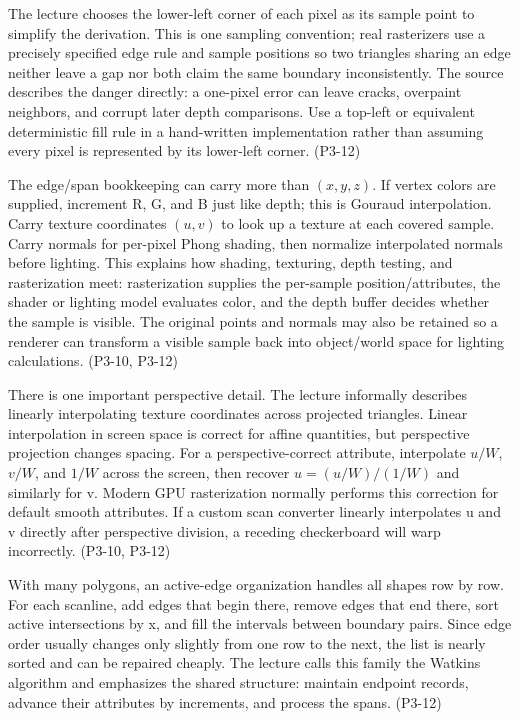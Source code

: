 The lecture chooses the lower-left corner of each pixel as its sample point to simplify the derivation. This is one sampling convention; real rasterizers use a precisely specified edge rule and sample positions so two triangles sharing an edge neither leave a gap nor both claim the same boundary inconsistently. The source describes the danger directly: a one-pixel error can leave cracks, overpaint neighbors, and corrupt later depth comparisons. Use a top-left or equivalent deterministic fill rule in a hand-written implementation rather than assuming every pixel is represented by its lower-left corner. (P3-12)

The edge/span bookkeeping can carry more than \((x,y,z)\). If vertex colors are supplied, increment R, G, and B just like depth; this is Gouraud interpolation. Carry texture coordinates \((u,v)\) to look up a texture at each covered sample. Carry normals for per-pixel Phong shading, then normalize interpolated normals before lighting. This explains how shading, texturing, depth testing, and rasterization meet: rasterization supplies the per-sample position/attributes, the shader or lighting model evaluates color, and the depth buffer decides whether the sample is visible. The original points and normals may also be retained so a renderer can transform a visible sample back into object/world space for lighting calculations. (P3-10, P3-12)

There is one important perspective detail. The lecture informally describes linearly interpolating texture coordinates across projected triangles. Linear interpolation in screen space is correct for affine quantities, but perspective projection changes spacing. For a perspective-correct attribute, interpolate \(u/W\), \(v/W\), and \(1/W\) across the screen, then recover \(u=(u/W)/(1/W)\) and similarly for v. Modern GPU rasterization normally performs this correction for default smooth attributes. If a custom scan converter linearly interpolates u and v directly after perspective division, a receding checkerboard will warp incorrectly. (P3-10, P3-12)

With many polygons, an active-edge organization handles all shapes row by row. For each scanline, add edges that begin there, remove edges that end there, sort active intersections by x, and fill the intervals between boundary pairs. Since edge order usually changes only slightly from one row to the next, the list is nearly sorted and can be repaired cheaply. The lecture calls this family the Watkins algorithm and emphasizes the shared structure: maintain endpoint records, advance their attributes by increments, and process the spans. (P3-12)

